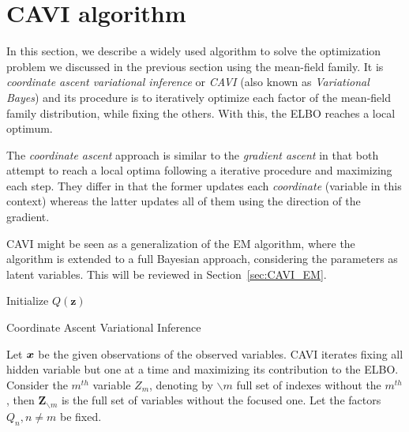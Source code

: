 \section{CAVI algorithm }

In this section, we describe a widely used algorithm to solve the optimization problem we discussed in the previous section using the mean-field family. It is \emph{coordinate ascent variational inference} or \emph{CAVI} (also known as \emph{Variational Bayes}) and its procedure is to iteratively optimize each factor of the mean-field family distribution, while fixing the others. With this, the ELBO reaches a local optimum.

The \emph{coordinate ascent} approach is similar to the \emph{gradient ascent} in that both attempt to reach a local optima following a iterative procedure and maximizing each step. They differ in that the former updates each \emph{coordinate} (variable in this context) whereas the latter updates all of them using the direction of the gradient.

CAVI might be seen as a generalization of the EM algorithm, where the algorithm is extended to a full Bayesian approach, considering the parameters as latent variables. This will be reviewed in Section~\ref{sec:CAVI_EM}.

 \begin{algorithm}[t]
  \SetAlgoLined{}
  Initialize \(Q(\bm{z})\)\;
  \;
  \caption{Coordinate Ascent Variational Inference}\label{alg:cavi}
\end{algorithm}


Let \(\bm{x}\) be the given observations of the observed variables. CAVI iterates fixing all hidden variable but one at a time and maximizing its contribution to the ELBO. Consider the \(m^{th}\) variable \(Z_{m}\), denoting by \(\backslash m\) full set of indexes without the \(m^{th}\), then \(\bm{Z}_{\backslash m}\) is the full set of variables without the focused one. Let the factors \(Q_{n}, n\neq m\) be fixed.

